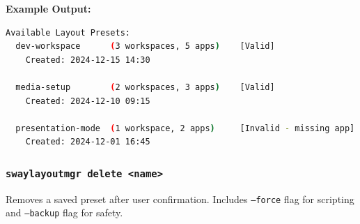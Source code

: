 \documentclass[12pt, letterpaper]{article}
\begin{document}
\textbf{Example Output:}

\begin{lstlisting}[language=bash, caption=Layout preset list output]
Available Layout Presets:
  dev-workspace      (3 workspaces, 5 apps)    [Valid]
    Created: 2024-12-15 14:30

  media-setup        (2 workspaces, 3 apps)    [Valid]
    Created: 2024-12-10 09:15

  presentation-mode  (1 workspace, 2 apps)     [Invalid - missing app]
    Created: 2024-12-01 16:45
\end{lstlisting}

\subsubsection*{\texttt{swaylayoutmgr delete <name>}}

Removes a saved preset after user confirmation. Includes \texttt{--force} flag for scripting and \texttt{--backup} flag for safety.
\end{document}
